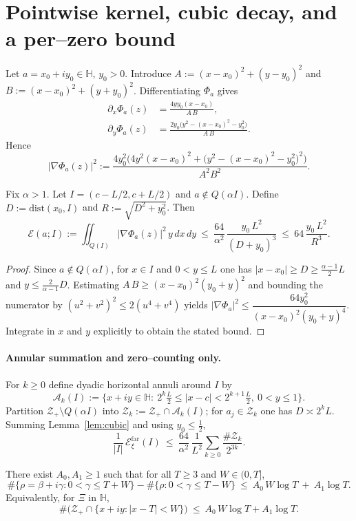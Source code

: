 \section*{Pointwise kernel, cubic decay, and a per–zero bound}
Let $a=x_0+i y_0\in\mathbb{H}$, $y_0>0$. Introduce $A:= (x-x_0)^2+(y-y_0)^2$ and $B:=(x-x_0)^2+(y+y_0)^2$. Differentiating $\Phi_a$ gives
\begin{align*}
\partial_x \Phi_a(z)&=\frac{4 y y_0 (x-x_0)}{A\,B},\\
\partial_y \Phi_a(z)&=\frac{2 y_0\big(y^2-(x-x_0)^2-y_0^2\big)}{A\,B}.
\end{align*}
Hence
\[
|\nabla \Phi_a(z)|^2
:=\frac{4y_0^2\big(4y^2(x-x_0)^2+\big(y^2-(x-x_0)^2-y_0^2\big)^2\big)}{A^2 B^2}.
\]

\begin{lemma}\label{lem:cubic}
Fix $\alpha>1$. Let $I=(c-L/2,c+L/2)$ and $a\notin Q(\alpha I)$. Define $D:=\mathrm{dist}(x_0,I)$ and $R:=\sqrt{D^2+y_0^2}$. Then
\[
\mathcal{E}(a;I):=\iint_{Q(I)} |\nabla \Phi_a(z)|^2\,y\,dx\,dy\ \le\ \frac{64}{\alpha^2}\,\frac{y_0\,L^2}{(D+y_0)^3}\ \le\ 64\,\frac{y_0\,L^2}{R^3}.
\]
\end{lemma}

\begin{proof}
Since $a\notin Q(\alpha I)$, for $x\in I$ and $0<y\le L$ one has $|x-x_0|\ge D\ge \tfrac{\alpha-1}{2}L$ and $y\le \tfrac{2}{\alpha-1}D$. Estimating $A\,B\ge (x-x_0)^2 (y_0+y)^2$ and bounding the numerator by $(u^2+v^2)^2\le 2(u^4+v^4)$ yields $|\nabla\Phi_a|^2\le \dfrac{64y_0^2}{(x-x_0)^2(y_0+y)^4}$. Integrate in $x$ and $y$ explicitly to obtain the stated bound.
\end{proof}

\paragraph{Annular summation and zero–counting only.}
For $k\ge 0$ define dyadic horizontal annuli around $I$ by
\[
\mathcal{A}_k(I):=\Big\{x+iy\in\mathbb{H}:\ 2^k\tfrac{L}{2}\le |x-c|<2^{k+1}\tfrac{L}{2},\ 0<y\le 1\Big\}.
\]
Partition $\mathcal{Z}_+\setminus Q(\alpha I)$ into $\mathcal{Z}_k:=\mathcal{Z}_+\cap \mathcal{A}_k(I)$; for $a_j\in\mathcal{Z}_k$ one has $D\asymp 2^k L$. Summing Lemma~\ref{lem:cubic} and using $y_0\le \tfrac{1}{2}$,
\[
\frac{1}{|I|}\,\mathcal{E}^{\mathrm{far}}_{\xi}(I)\ \le\ \frac{64}{\alpha^2}\,\frac{1}{L^2}\sum_{k\ge0}\frac{\#\mathcal{Z}_k}{2^{3k}}.
\]

\begin{lemma}\label{lem:zc}
There exist $A_0,A_1\ge 1$ such that for all $T\ge 3$ and $W\in(0,T]$,
\[
\#\{\rho=\beta+i\gamma: 0<\gamma\le T+W\}-\#\{\rho: 0<\gamma\le T-W\}\ \le\ A_0\,W\log T\ +\ A_1\log T.
\]
Equivalently, for $\Xi$ in $\mathbb{H}$,
\[
\#\big(\mathcal{Z}_+\cap\{x+iy: |x-T|<W\}\big)\ \le\ A_0\,W\log T + A_1\log T.
\]
\end{lemma}

